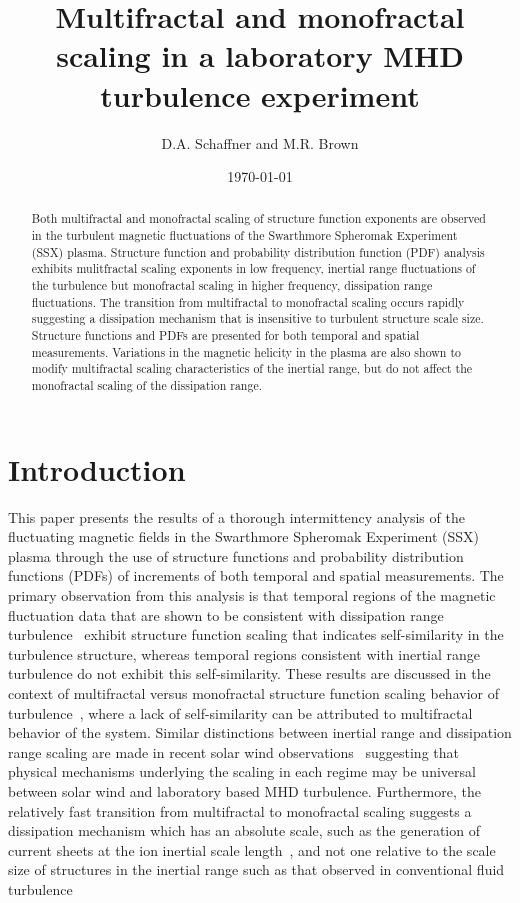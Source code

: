 \documentclass[preprint2]{aastex}
\begin{document}
\title{Multifractal and monofractal scaling in a laboratory MHD turbulence experiment}

\author{D.A. Schaffner and M.R. Brown}

\date{\today}
\begin{abstract}
Both multifractal and monofractal scaling of structure function exponents are observed in the turbulent magnetic fluctuations of the Swarthmore Spheromak Experiment (SSX) plasma. Structure function and probability distribution function (PDF) analysis exhibits mulitfractal scaling exponents in low frequency, inertial range fluctuations of the turbulence but monofractal scaling in higher frequency, dissipation range fluctuations. The transition from multifractal to monofractal scaling occurs rapidly suggesting a dissipation mechanism that is insensitive to turbulent structure scale size. Structure functions and PDFs are presented for both temporal and spatial measurements. Variations in the magnetic helicity in the plasma are also shown to modify multifractal scaling characteristics of the inertial range, but do not affect the monofractal scaling of the dissipation range.
\end{abstract}


\section{Introduction}

This paper presents the results of a thorough intermittency analysis of the fluctuating magnetic fields in the Swarthmore Spheromak Experiment (SSX) plasma through the use of structure functions and probability distribution functions (PDFs) of increments of both temporal and spatial measurements. The primary observation from this analysis is that temporal regions of the magnetic fluctuation data that are shown to be consistent with dissipation range turbulence~\citep{schaffner2014c} exhibit structure function scaling that indicates self-similarity in the turbulence structure, whereas temporal regions consistent with inertial range turbulence do not exhibit this self-similarity. These results are discussed in the context of multifractal versus monofractal structure function scaling behavior of turbulence~\citep{paladin1987,frisch1995,marsch1997}, where a lack of self-similarity can be attributed to multifractal behavior of the system. Similar distinctions between inertial range and dissipation range scaling are made in recent solar wind observations~\citep{kiyani2013} suggesting that physical mechanisms underlying the scaling in each regime may be universal between solar wind and laboratory based MHD turbulence. Furthermore, the relatively fast transition from multifractal to monofractal scaling suggests a dissipation mechanism which has an absolute scale, such as the generation of current sheets at the ion inertial scale length~\citep{kiyani2009,kiyani2010}, and not one relative to the scale size of structures in the inertial range such as that observed in conventional fluid turbulence~\citep{chevillard2005}
\end{document}
